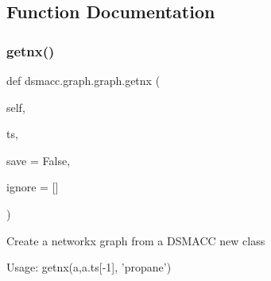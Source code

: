\subsection{Function Documentation}
\mbox{\label{namespacedsmacc_1_1graph_1_1graph_a92150b89f1671886a95899c7f6a1b139}} 
\subsubsection{\texorpdfstring{getnx()}{getnx()}}
{\footnotesize\ttfamily def dsmacc.\+graph.\+graph.\+getnx (\begin{DoxyParamCaption}\item[{}]{self,  }\item[{}]{ts,  }\item[{}]{save = {\ttfamily False},  }\item[{}]{ignore = {\ttfamily \mbox{[}\mbox{]}} }\end{DoxyParamCaption})}

\begin{DoxyVerb}Create a networkx graph from a DSMACC new class

Usage: 
    getnx(a,a.ts[-1], 'propane')
\end{DoxyVerb}
 
